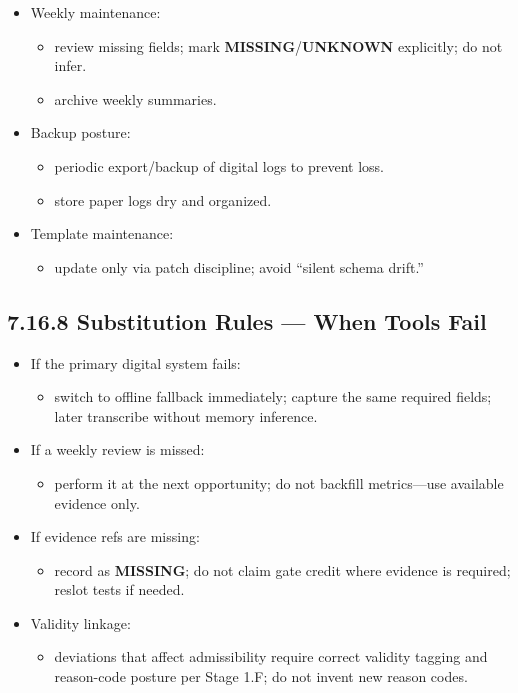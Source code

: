 \documentclass[10pt]{article}
\begin{document}
\begin{itemize}
\item Weekly maintenance:
  \begin{itemize}
  \item review missing fields; mark \textbf{MISSING}/\textbf{UNKNOWN} explicitly; do not infer.
  \item archive weekly summaries.
  \end{itemize}
\item Backup posture:
  \begin{itemize}
  \item periodic export/backup of digital logs to prevent loss.
  \item store paper logs dry and organized.
  \end{itemize}
\item Template maintenance:
  \begin{itemize}
  \item update only via patch discipline; avoid “silent schema drift.”
  \end{itemize}
\end{itemize}

\subsection*{7.16.8 Substitution Rules — When Tools Fail}
{}

\begin{itemize}
\item If the primary digital system fails:
  \begin{itemize}
  \item switch to offline fallback immediately; capture the same required fields; later transcribe without memory inference.
  \end{itemize}
\item If a weekly review is missed:
  \begin{itemize}
  \item perform it at the next opportunity; do not backfill metrics—use available evidence only.
  \end{itemize}
\item If evidence refs are missing:
  \begin{itemize}
  \item record as \textbf{MISSING}; do not claim gate credit where evidence is required; reslot tests if needed.
  \end{itemize}
\item Validity linkage:
  \begin{itemize}
  \item deviations that affect admissibility require correct validity tagging and reason-code posture per Stage 1.F; do not invent new reason codes.
  \end{itemize}
\end{itemize}
\end{document}
